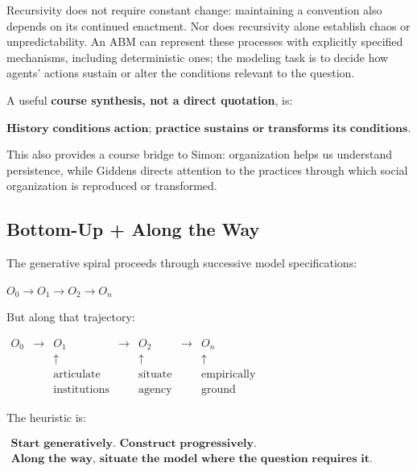\documentclass[11pt,a4paper]{article}
\newenvironment{fitdisplay}{\par\medskip\noindent\begin{lrbox}{\displaybox}$\displaystyle}{%
$\end{lrbox}\makebox[\linewidth][c]{\ifdim\wd\displaybox>\linewidth\resizebox{\linewidth}{!}{\usebox{\displaybox}}\else\usebox{\displaybox}\fi}\par\medskip}
\begin{document}
Recursivity does not require constant change: maintaining a convention also depends on its continued enactment. Nor does recursivity alone establish chaos or unpredictability. An ABM can represent these processes with explicitly specified mechanisms, including deterministic ones; the modeling task is to decide how agents' actions sustain or alter the conditions relevant to the question.

A useful \textbf{course synthesis, not a direct quotation}, is:
\begin{fitdisplay}
\boxed{\textbf{History conditions action; practice sustains or transforms its conditions.}}
\end{fitdisplay}

This also provides a course bridge to Simon: organization helps us understand persistence, while Giddens directs attention to the practices through which social organization is reproduced or transformed.

\subsection{Bottom-Up + Along the Way}

The generative spiral proceeds through successive model specifications:

\begin{fitdisplay}
\boxed{
O_0
\longrightarrow
O_1
\longrightarrow
O_2
\longrightarrow
O_n
}
\end{fitdisplay}

But along that trajectory:

\begin{fitdisplay}
\boxed{
\begin{array}{ccccccc}
O_0 &\longrightarrow& O_1 &\longrightarrow& O_2 &\longrightarrow& O_n\\
&&\uparrow&&\uparrow&&\uparrow\\
&&\text{articulate}&&\text{situate}&&\text{empirically}\\
&&\text{institutions}&&\text{agency}&&\text{ground}
\end{array}}
\end{fitdisplay}

The heuristic is:

\begin{fitdisplay}
\boxed{\begin{gathered}
\textbf{Start generatively. Construct progressively.}\\
\textbf{Along the way, situate the model where the question requires it.}
\end{gathered}}
\end{fitdisplay}
\end{document}
